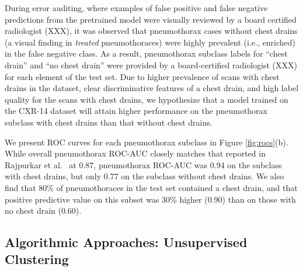 \documentclass{article}
\begin{document}
During error auditing, where examples of false positive and false negative predictions from the pretrained model were visually reviewed by a board certified radiologist (XXX),
it was observed that pneumothorax cases without chest drains (a visual finding in \textit{treated} pneumothoraces) were highly prevalent (i.e., enriched) in the false negative class.
 As a result, pneumothorax subclass labels for ``chest drain'' and ``no chest drain'' were provided by a board-certified radiologist (XXX) for each element of the test set.  
 Due to higher prevalence of scans with chest drains in the dataset, clear discriminative features of a chest drain, and high label quality for the scans with chest drains, we hypothesize that a model trained on the CXR-14 dataset will attain higher performance on the pneumothorax subclass with chest drains than that without chest drains.  
 

We present ROC curves for each pneumothorax subclass in Figure \ref{fig:rocs}(b).  
While overall pneumothorax ROC-AUC closely matches that reported in Rajpurkar et al.~\citep{rajpurkar2017chexnet} at 0.87, pneumothorax ROC-AUC was 0.94 on the subclass with chest drains, but only 0.77 on the subclass without chest drains.  
We also find that 80\% of pneumothoraces in the test set contained a chest drain, and that positive predictive value on this subset was 30\% higher (0.90) than on those with no chest drain (0.60).  

\subsection{Algorithmic Approaches: Unsupervised Clustering}
\end{document}
